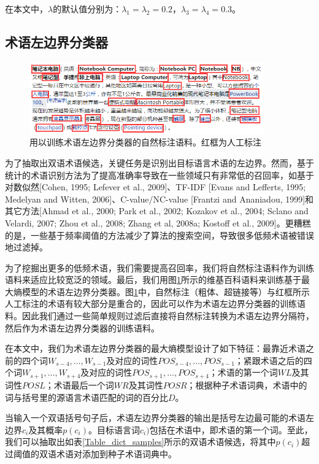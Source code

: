 在本文中，$\lambda$的默认值分别为：$\lambda_1 = \lambda_2 = 0.2$，$\lambda_3 = \lambda_4 =0.3$。

\subsection{术语左边界分类器}

\begin{figure}[!bt]
	\centering
	\includegraphics[width=0.9\textwidth]{Figure/Figure_4_5.png}
	\caption{用以训练术语左边界分类器的自然标注语料。红框为人工标注}
	\label{Fig_term_left_trainning}
\end{figure}

为了抽取出双语术语候选，关键任务是识别出目标语言术语的左边界。然而，基于统计的术语识别方法为了提高准确率导致在一些领域只有非常低的召回率，如基于对数似然[Cohen, 1995; Lefever et al., 2009]、TF-IDF [Evans and Lefferts, 1995; Medelyan and Witten, 2006]、C-value/NC-value [Frantzi and Ananiadou, 1999]和其它方法[Ahmad et al., 2000; Park et al., 2002; Kozakov et al., 2004; Sclano and Velardi, 2007; Zhou et al., 2008; Zhang et al, 2008a; Kostoff et al., 2009]。更糟糕的是，一些基于频率阈值的方法减少了算法的搜索空间，导致很多低频术语被错误地过滤掉。

为了挖掘出更多的低频术语，我们需要提高召回率，我们将自然标注语料作为训练语料来适应比较宽泛的领域。最后，我们用图\ref{Fig_term_left_trainning}所示的维基百科语料来训练基于最大熵模型的术语左边界分类器。图\ref{Fig_term_left_trainning}中，自然标注（粗体、超链接等）与红框所示人工标注的术语有较大部分是重合的，因此可以作为术语左边界分类器的训练语料。因此我们通过一些简单规则过滤后直接将自然标注转换为术语左边界分隔符，然后作为术语左边界分类器的训练语料。

在本文中，我们为术语左边界分类器的最大熵模型设计了如下特征：最靠近术语之前的四个词$W_{s-4}, \ldots, W_{s-1}$及对应的词性$POS_{s-4}, \ldots, POS_{s-1}$；紧跟术语之后的四个词$W_{s+1}, \ldots, W_{s+4}$及对应的词性$POS_{s+1}, \ldots, POS_{s+4}$；术语的第一个词$WL$及其词性$POSL$；术语最后一个词$WR$及其词性$POSR$；根据种子术语词典，术语中的词与括号里的源语言术语匹配的词的百分比$D$。

当输入一个双语括号句子后，术语左边界分类器的输出是括号左边最可能的术语左边界$c_i$及其概率$p(c_i)$。目标语言词$c_i)$包括在术语中，即术语的第一个词。至此，我们可以抽取出如表\ref{Table_dict_samples}所示的双语术语候选，将其中$p(c_i)$超过阈值的双语术语对添加到种子术语词典中。

